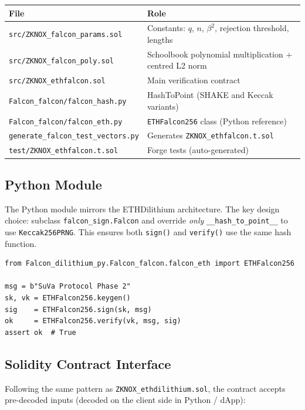 \documentclass[11pt,a4paper]{article}
\begin{document}
\begin{center}
\begin{tabular}{lp{8.5cm}}
\toprule
File & Role \\
\midrule
\texttt{src/ZKNOX\_falcon\_params.sol}
  & Constants: $q$, $n$, $\beta^2$, rejection threshold, lengths \\
\texttt{src/ZKNOX\_falcon\_poly.sol}
  & Schoolbook polynomial multiplication + centred L2 norm \\
\texttt{src/ZKNOX\_ethfalcon.sol}
  & Main verification contract \\
\midrule
\texttt{Falcon\_falcon/falcon\_hash.py}
  & HashToPoint (SHAKE and Keccak variants) \\
\texttt{Falcon\_falcon/falcon\_eth.py}
  & \texttt{ETHFalcon256} class (Python reference) \\
\texttt{generate\_falcon\_test\_vectors.py}
  & Generates \texttt{ZKNOX\_ethfalcon.t.sol} \\
\texttt{test/ZKNOX\_ethfalcon.t.sol}
  & Forge tests (auto-generated) \\
\bottomrule
\end{tabular}
\end{center}

\subsection{Python Module}

The Python module mirrors the ETHDilithium architecture.
The key design choice: subclass \texttt{falcon\_sign.Falcon} and override
\emph{only} \texttt{\_\_hash\_to\_point\_\_} to use \texttt{Keccak256PRNG}.
This ensures both \texttt{sign()} and \texttt{verify()} use the same hash function.

\begin{lstlisting}[style=python,caption={ETHFalcon256 usage}]
from Falcon_dilithium_py.Falcon_falcon.falcon_eth import ETHFalcon256

msg = b"SuVa Protocol Phase 2"
sk, vk = ETHFalcon256.keygen()
sig    = ETHFalcon256.sign(sk, msg)
ok     = ETHFalcon256.verify(vk, msg, sig)
assert ok  # True
\end{lstlisting}

\subsection{Solidity Contract Interface}

Following the same pattern as \texttt{ZKNOX\_ethdilithium.sol}, the contract
accepts pre-decoded inputs (decoded on the client side in Python / dApp):
\end{document}
